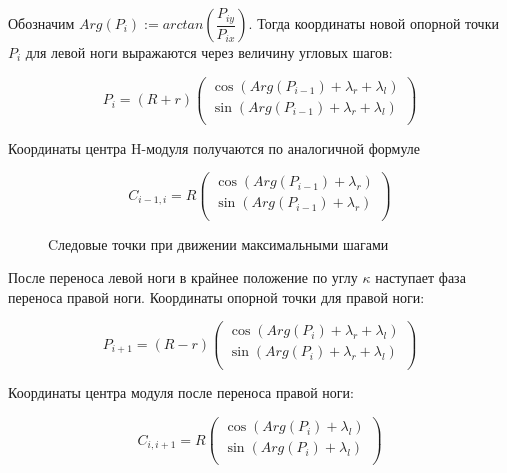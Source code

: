 Обозначим $Arg(P_i) := arctan\left(\dfrac{P_{iy}}{P_{ix}}\right)$. Тогда координаты новой опорной точки $P_i$ для левой ноги выражаются через величину угловых шагов:

\begin{equation}
P_i = (R+r)\left(\begin{array}{c}
\cos{(Arg(P_{i-1})+\lambda_r+\lambda_l)}\\
\sin{(Arg(P_{i-1})+\lambda_r+\lambda_l)}\\
\end{array}\right)
\end{equation}


Координаты центра H-модуля получаются по аналогичной формуле

\begin{equation}
C_{i-1,i} = R\left(\begin{array}{c}
\cos{(Arg(P_{i-1})+\lambda_r)}\\
\sin{(Arg(P_{i-1})+\lambda_r)}\\
\end{array}\right)
\end{equation}

\begin{figure}
\caption{Cледовые точки при движении максимальными шагами}
\end{figure}

После переноса левой ноги в крайнее положение по углу $\kappa$ наступает фаза переноса правой ноги. Координаты опорной точки для правой ноги:

\begin{equation}
P_{i+1} = (R-r)\left(\begin{array}{c}
\cos{(Arg(P_{i})+\lambda_r+\lambda_l)}\\
\sin{(Arg(P_{i})+\lambda_r+\lambda_l)}\\
\end{array}\right)
\end{equation}

Координаты центра модуля после переноса правой ноги:

\begin{equation}
C_{i,i+1} = R\left(\begin{array}{c}
\cos{(Arg(P_{i})+\lambda_l)}\\
\sin{(Arg(P_{i})+\lambda_l)}\\
\end{array}\right)
\end{equation}

